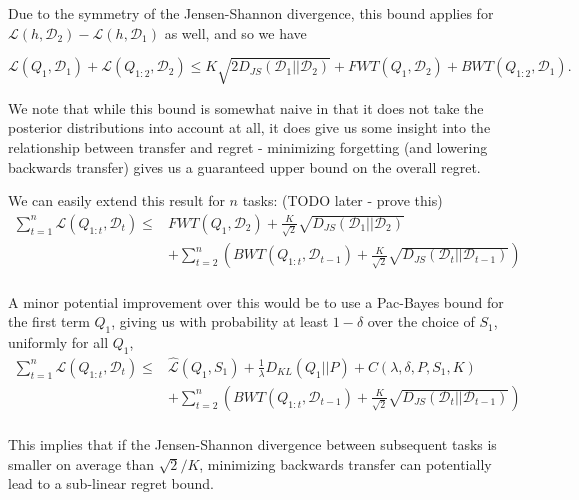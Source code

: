 \documentclass[letterpaper]{article}
\theoremstyle{definition}
\begin{document}
Due to the symmetry of the Jensen-Shannon divergence, this bound applies for $\mathcal{L}(h, \mathcal{D}_2)-\mathcal{L}(h, \mathcal{D}_1)$ as well, and so we have

\begin{equation}
\mathcal{L}(Q_1, \mathcal{D}_1)+\mathcal{L}(Q_{1:2}, \mathcal{D}_2) \leq 
K\sqrt{2 D_{JS}(\mathcal{D}_1||\mathcal{D}_2)}+FWT(Q_1, \mathcal{D}_2)+ BWT(Q_{1:2}, \mathcal{D}_1).
\end{equation}

We note that while this bound is somewhat naive in that it does not take the posterior distributions into account at all, it does give us some insight into the relationship between transfer and regret - minimizing forgetting (and lowering backwards transfer) gives us a guaranteed upper bound on the overall regret. 

We can easily extend this result for $n$ tasks: (TODO later - prove this) %
\begin{equation}
\begin{split}
 \sum_{t=1}^{n}\mathcal{L}(Q_{1:t}, \mathcal{D}_t) \leq &  FWT(Q_1, \mathcal{D}_2) + \frac{K}{\sqrt{2}}\sqrt{D_{JS}(\mathcal{D}_{1}||\mathcal{D}_{2})} \\ &+ \sum_{t=2}^{n}\left ( BWT(Q_{1:t}, \mathcal{D}_{t-1})+ \frac{K}{\sqrt{2}}\sqrt{D_{JS}(\mathcal{D}_{t}||\mathcal{D}_{t-1})}\right ) \\&
 \end{split}
\end{equation}

A minor potential improvement over this would be to use a Pac-Bayes bound for the first term $Q_1$, giving us with probability at least $1-\delta$ over the choice of $S_1$, uniformly for all $Q_1$,
\begin{equation}
\begin{split}
\sum_{t=1}^{n}\mathcal{L}(Q_{1:t}, \mathcal{D}_t) \leq &  \hat{\mathcal{L}}(Q_1, S_1)+\frac{1}{\lambda}D_{KL}(Q_1||P)+C(\lambda,\delta,P,S_1, K) \\ &+ \sum_{t=2}^{n}\left ( BWT(Q_{1:t}, \mathcal{D}_{t-1})+ \frac{K}{\sqrt{2}}\sqrt{D_{JS}(\mathcal{D}_{t}||\mathcal{D}_{t-1})}\right ) \\&
\end{split}
\end{equation}

This implies that if the Jensen-Shannon divergence between subsequent tasks is smaller on average than $\sqrt{2}/K$, minimizing backwards transfer can potentially lead to a sub-linear regret bound.

\clearpage


\end{document}
